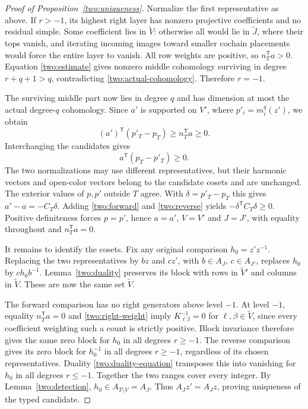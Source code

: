 \begin{proof}[Proof of Proposition~\ref{two:uniqueness}]
Normalize the first representative as above.  If $r>-1$, its highest
right layer has nonzero projective coefficients and no residual
simple.  Some coefficient lies in $\widetilde V$: otherwise all
would lie in $\widetilde J$, where their tops vanish, and iterating
incoming images toward smaller cochain placements would force the
entire layer to vanish.  All row weights are positive, so
$n_T^{\mathsf T}a>0$.  Equation \eqref{two:estimate} gives nonzero
middle cohomology surviving in degree $r+q+1>q$, contradicting
\eqref{two:actual-cohomology}.  Therefore $r=-1$.

The surviving middle part now lies in degree $q$ and has dimension
at most the actual degree-$q$ cohomology.  Since $a'$ is supported
on $V'$, where $p'_i=m_i^q(z')$, we obtain
\begin{equation}
 (a')^{\mathsf T}(p'_T-p_T)\ge n_T^{\mathsf T}a\ge0.
 \label{two:forward}
\end{equation}
Interchanging the candidates gives
\begin{equation}
 a^{\mathsf T}(p_T-p'_T)\ge0.
 \label{two:reverse}
\end{equation}
The two normalizations may use different representatives, but their
harmonic vectors and open-color vectors belong to the candidate
cosets and are unchanged.  The exterior values of $p,p'$ outside
$T$ agree.  With $\delta=p'_T-p_T$ this gives $a'-a=-C_T\delta$.
Adding \eqref{two:forward} and \eqref{two:reverse} yields
$-\delta^{\mathsf T}C_T\delta\ge0$.  Positive definiteness forces
$p=p'$, hence $a=a'$, $V=V'$ and $J=J'$, with equality throughout
and $n_T^{\mathsf T}a=0$.

It remains to identify the cosets.  Fix any original comparison
$h_0=z'z^{-1}$.  Replacing the two representatives by $bz$ and
$cz'$, with $b\in A_J$, $c\in A_{J'}$, replaces $h_0$ by
$ch_0b^{-1}$.  Lemma~\ref{two:duality} preserves its block with
rows in $\widetilde V'$ and columns in $\widetilde V$.  These are
now the same set $\widetilde V$.

The forward comparison has no right generators above level $-1$.
At level $-1$, equality $n_T^{\mathsf T}a=0$ and
\eqref{two:right-weight} imply
$K^{-1}_{\ell\beta}=0$ for $\ell,\beta\in\widetilde V$, since
every coefficient weighting such a count is strictly positive.
Block invariance therefore gives the same zero block for $h_0$
in all degrees $r\ge-1$.  The reverse comparison gives its zero
block for $h_0^{-1}$ in all degrees $r\ge-1$, regardless of its
chosen representatives.  Duality \eqref{two:duality-equation}
transposes this into vanishing for $h_0$ in all degrees $r\le-1$.
Together the two ranges cover every integer.  By
Lemma~\ref{two:detection}, $h_0\in A_{T\setminus V}=A_J$.
Thus $A_Jz'=A_Jz$, proving uniqueness of the typed candidate.
\end{proof}
